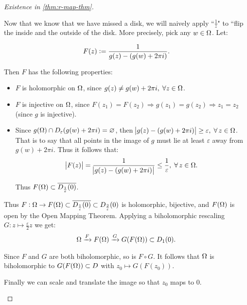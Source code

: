 \begin{proof}[Existence in \ref{thm:r-map-thm}]
\begin{enumerate}
Now that we know that we have missed a disk, we will naively apply ``$\frac{1}{z}$" to ``flip the inside and the outside of the disk. More precisely, pick any $w \in \Omega$. Let:

\begin{align*}
    F(z) \vcentcolon = \frac{1}{g(z) - ( g( w) + 2 \pi i) }.
\end{align*}

Then $F$ has the following properties:
\begin{itemize}
    \item $F$ is holomorphic on $\Omega$, since $g(z) \neq g(w) + 2 \pi i, \; \forall z \in \Omega$.
    \item $F$ is injective on $\Omega$, since $F(z_1) = F(z_2) \Rightarrow g(z_1) = g(z_2) \Rightarrow z_1 = z_2$ (since $g$ is injective).
    \item Since $g(\Omega) \cap D_\varepsilon ( g(w) + 2 \pi i) = \varnothing$, then $\abs{g(z) - (g(w) + 2 \pi i)} \geq \varepsilon, \; \forall \, z \in \Omega$. That is to say that all points in the image of $g$ must lie at least $\varepsilon$ away from $g(w) + 2 \pi i$. Thus it follows that:
    \begin{align*}
        \abs{F(z)} = \frac{1}{\abs{g(z) - (g(w) + 2 \pi i)}} \leq \frac{1}{\varepsilon}, \; \forall \, z \in \Omega.
    \end{align*}
    
    Thus $F(\Omega) \subset \overline{D_\frac{1}{\varepsilon} (0)}$.
\end{itemize}

Thus $F: \Omega \to F(\Omega) \subset \overline{D_\frac{1}{\varepsilon} (0)} \subset D_\frac{2}{\varepsilon} (0)$ is holomorphic, bijective, and $F(\Omega)$ is open by the Open Mapping Theorem. Applying a biholomorphic rescaling $G: z \mapsto \frac{\varepsilon }{2} z$ we get:
\begin{align*}
    \Omega \xrightarrow[]{F} F(\Omega) \xrightarrow[]{G} G(F(\Omega)) \subset D_1(0).
\end{align*}

Since $F$ and $G$ are both biholomorphic, so is $F \circ G$. It follows that $\Omega$ is biholomorphic to $G(F(\Omega)) \subset D$ with $z_0 \mapsto G(F(z_0))$.

Finally we can scale and translate the image so that $z_0$ maps to $0$.

\begin{center}
\end{center}
\end{enumerate}
\end{proof}
